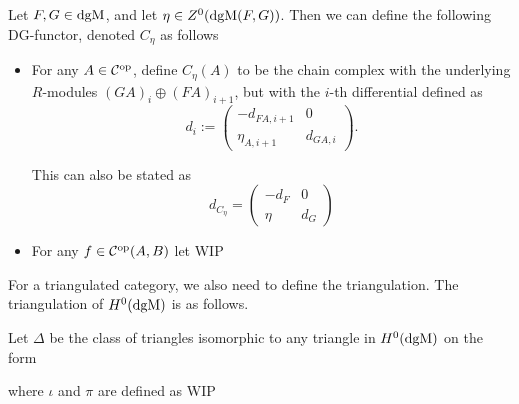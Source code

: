 \begin{definition}
    Let \( F, G \in \operatorname{dgM} \), and let \( \eta \in Z^0(\operatorname{dgM}(F, G)) \). Then we can define the following DG-functor, denoted \( C_{\eta} \) as follows
    \begin{itemize}
        \item {
            For any \( A \in {\mathcal{C}}^{\operatorname{op}} \), define \( C_{\eta}(A) \) to be the chain complex with the underlying \( R \)-modules \( (GA)_i \oplus (FA)_{i + 1} \), but with the \( i \)-th differential defined as
            \[
                d_i :=
                \begin{pmatrix}
                    -d_{FA, i + 1} & 0 \\
                    \eta_{A, i + 1} & d_{GA, i}
                \end{pmatrix}.
            \]

            This can also be stated as
            \[
                d_{C_{\eta}} =
                \begin{pmatrix}
                    -d_F & 0 \\
                    \eta & d_G
                \end{pmatrix}
            \]
        }
        \item {
            For any \( f \in {\mathcal{C}}^{\operatorname{op}}(A, B) \) let WIP
        }
    \end{itemize}
\end{definition}

For a triangulated category, we also need to define the triangulation. The triangulation of \( H^0(\operatorname{dgM}) \) is as follows.
\begin{definition}
    \label{def:delta_H_0_dgmod}
    Let \( \Delta \) be the class of triangles isomorphic to any triangle in \( H^0(\operatorname{dgM}) \) on the form
    \begin{center}
    \end{center}
    where \( \iota \) and \( \pi \) are defined as WIP
\end{definition}

